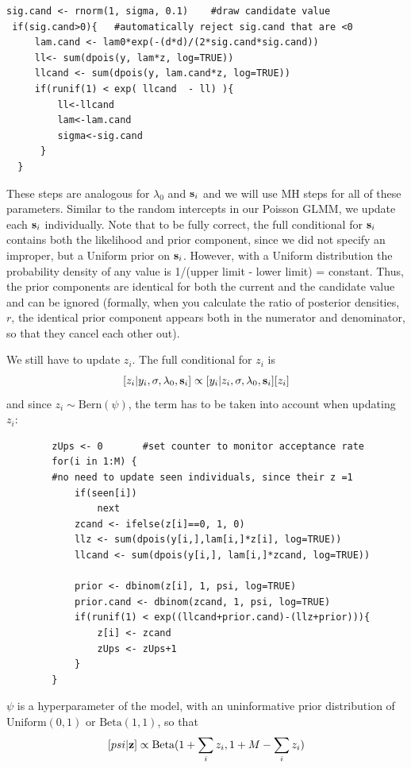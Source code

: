 \begin{verbatim}
sig.cand <- rnorm(1, sigma, 0.1)	#draw candidate value
 if(sig.cand>0){   #automatically reject sig.cand that are <0
     lam.cand <- lam0*exp(-(d*d)/(2*sig.cand*sig.cand))
     ll<- sum(dpois(y, lam*z, log=TRUE))
     llcand <- sum(dpois(y, lam.cand*z, log=TRUE))
     if(runif(1) < exp( llcand  - ll) ){
         ll<-llcand
         lam<-lam.cand
         sigma<-sig.cand
      }
  }
\end{verbatim}

These steps are analogous for  $\lambda_{0}$ and ${\bf s}_i$ and we will 
use MH steps for
all of these parameters. Similar to the random intercepts in our
Poisson GLMM, we update each ${\bf s}_i$ individually. Note that to be fully
correct, the full conditional for ${\bf s}_i$ contains both the likelihood and
prior component, since we did not specify an improper, but a Uniform
prior on ${\bf s}_i$. However, with a Uniform distribution the probability
density of any value is 1/(upper limit - lower limit) =
constant. Thus, the prior components are identical for both the
current and the candidate value and can be ignored (formally, when you
calculate the ratio of posterior densities, $r$, the identical prior
component appears both in the numerator and denominator, so that they
cancel each other out).

We still have to update $z_i$. The full conditional for $z_i$ is
\[
[z_i|y_{i}, \sigma, \lambda_0, {\bf s}_{i}] \propto [y_{i}|z_{i},\sigma, \lambda_0, 
{\bf s}_{i}] [z_i]
\]
and since $z_i \sim \mbox{Bern}(\psi)$,
the term has to be taken into account when updating $z_i$:

\begin{verbatim}
        zUps <- 0		#set counter to monitor acceptance rate
        for(i in 1:M) {
        #no need to update seen individuals, since their z =1
            if(seen[i])	
                next
            zcand <- ifelse(z[i]==0, 1, 0)
            llz <- sum(dpois(y[i,],lam[i,]*z[i], log=TRUE))
            llcand <- sum(dpois(y[i,], lam[i,]*zcand, log=TRUE))

            prior <- dbinom(z[i], 1, psi, log=TRUE)
            prior.cand <- dbinom(zcand, 1, psi, log=TRUE)
            if(runif(1) < exp((llcand+prior.cand)-(llz+prior))){
                z[i] <- zcand
                zUps <- zUps+1
            }
        }
\end{verbatim}

$\psi$
 is a hyperparameter of the model, with an uninformative prior 
 distribution of $\mbox{Uniform}(0,1)$ or $\mbox{Beta}(1,1)$, so that
\[
[psi|{\bf z}] \propto \mbox{Beta}(1 + \sum_i z_i, 1 + M-\sum_i z_i)
\]


